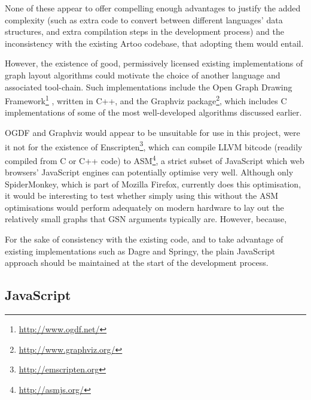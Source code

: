 None of these appear to offer compelling enough advantages to justify the added complexity (such as extra code to convert between different languages' data structures, and extra compilation steps in the development process) and the inconsistency with the existing Artoo codebase, that adopting them would entail. 

However, the existence of good, permissively licensed existing implementations of graph layout algorithms could motivate the choice of another language and associated tool-chain.
Such implementations include
the Open Graph Drawing Framework\footnote{\url{http://www.ogdf.net/}} \cite{handbook},
written in C++,
and the Graphviz package\footnote{\url{http://www.graphviz.org/}},
which includes C implementations of some of the most well-developed algorithms \cite{gansner1993, gansner1998} discussed earlier.

OGDF and Graphviz would appear to be unsuitable for use in this project, were it not for the existence of Enscripten\footnote{\url{http://emscripten.org}}, which can compile LLVM bitcode (readily compiled from C or C++ code) to ASM\footnote{\url{http://asmjs.org/}}, a strict subset of JavaScript which web browsers' JavaScript engines can potentially optimise very well. Although only SpiderMonkey, which is part of Mozilla Firefox, currently does this optimisation, it would be interesting to test whether simply using this without the ASM optimisations would perform adequately on modern hardware to lay out the relatively small graphs that GSN arguments typically are. However, because, 

For the sake of consistency with the existing code, and to take advantage of existing implementations such as Dagre and Springy, the plain JavaScript approach should be maintained at the start of the development process. 

\subsection{JavaScript}


